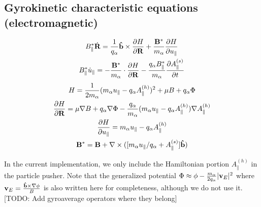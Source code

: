 \documentclass[]{article}
\begin{document}
\subsection{Gyrokinetic characteristic equations (electromagnetic)}
\begin{subequations}
	\begin{gather}
		B_\parallel^* \dot{\vb{R}} = \frac{1}{q_\alpha} \vu{b} \times \pdv{H}{\vb{R}} + \frac{\vb{B}^*}{m_\alpha} \pdv{H}{u_\parallel} \\
		B_\parallel^* \dot{u}_\parallel = - \frac{\vb{B}^*}{m_\alpha} \cdot \pdv{H}{\vb{R}} - \frac{q_\alpha B_\parallel^*}{m_\alpha} \pdv{A^{(s)}_\parallel}{t}
	\end{gather}
\end{subequations}
\begin{subequations}
	\begin{gather}
		H = \frac{1}{2 m_\alpha} (m_\alpha u_\parallel - q_\alpha A_\parallel^{(h)})^2 + \mu B + q_\alpha \Phi \\
		\pdv{H}{\vb{R}} = \mu \nabla B + q_\alpha \nabla \Phi - \frac{q_\alpha}{m_\alpha}(m_\alpha u_\parallel - q_\alpha A_\parallel^{(h)}) \nabla A_{\parallel}^{(h)} \\
		\pdv{H}{u_\parallel} = m_\alpha u_\parallel - q_\alpha A_{\parallel}^{(h)} \\
		\vb{B}^* = \vb{B} + \nabla \times ([m_\alpha u_\parallel/ q_\alpha + A_\parallel^{(s)}] \vu{b})
	\end{gather}
\end{subequations}

In the current implementation, we only include the Hamiltonian portion \(A_\parallel^{(h)}\) in the particle pusher.
Note that the generalized potential \(\Phi \approx \phi - \frac{m_\alpha}{2 q_\alpha} |\vb{v}_E|^2\) where \(\vb{v}_E = \frac{\vu{b} \times \nabla \phi}{B}\) is also written here for completeness, although we do not use it.
[TODO: Add gyroaverage operators where they belong]
\end{document}
